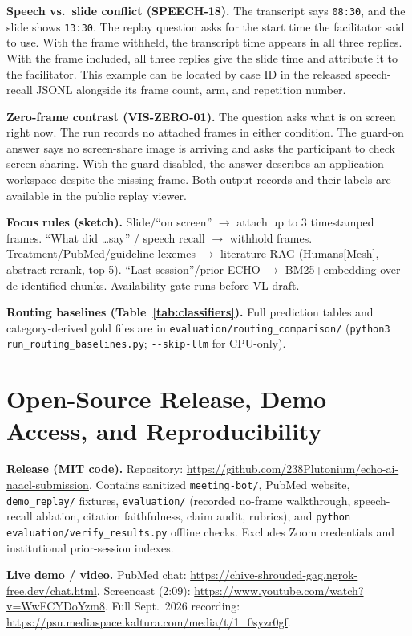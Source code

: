 \documentclass[11pt]{article}
\begin{document}
\textbf{Speech vs.\ slide conflict (SPEECH-18).} The transcript says \texttt{08:30}, and the slide shows \texttt{13:30}. The replay question asks for the start time the facilitator said to use. With the frame withheld, the transcript time appears in all three replies. With the frame included, all three replies give the slide time and attribute it to the facilitator. This example can be located by case ID in the released speech-recall JSONL alongside its frame count, arm, and repetition number.

\textbf{Zero-frame contrast (VIS-ZERO-01).} The question asks what is on screen right now. The run records no attached frames in either condition. The guard-on answer says no screen-share image is arriving and asks the participant to check screen sharing. With the guard disabled, the answer describes an application workspace despite the missing frame. Both output records and their labels are available in the public replay viewer.

\textbf{Focus rules (sketch).} Slide/``on screen'' $\rightarrow$ attach up to 3 timestamped frames. ``What did \ldots say'' / speech recall $\rightarrow$ withhold frames. Treatment/PubMed/guideline lexemes $\rightarrow$ literature RAG (Humans[Mesh], abstract rerank, top 5). ``Last session''/prior ECHO $\rightarrow$ BM25+embedding over de-identified chunks. Availability gate runs before VL draft.

\textbf{Routing baselines (Table~\ref{tab:classifiers}).} Full prediction tables and category-derived gold files are in \nolinkurl{evaluation/routing_comparison/} (\texttt{python3 run\_routing\_baselines.py}; \texttt{-{}-skip-llm} for CPU-only).

\section{Open-Source Release, Demo Access, and Reproducibility}

\textbf{Release (MIT code).} Repository: \url{https://github.com/238Plutonium/echo-ai-naacl-submission}. Contains sanitized \texttt{meeting-bot/}, PubMed website, \texttt{demo\_replay/} fixtures, \texttt{evaluation/} (recorded no-frame walkthrough, speech-recall ablation, citation faithfulness, claim audit, rubrics), and \texttt{python evaluation/verify\_results.py} offline checks. Excludes Zoom credentials and institutional prior-session indexes.

\textbf{Live demo / video.} PubMed chat: \url{https://chive-shrouded-gag.ngrok-free.dev/chat.html}. Screencast (2:09): \url{https://www.youtube.com/watch?v=WwFCYDoYzm8}. Full Sept.\ 2026 recording: \url{https://psu.mediaspace.kaltura.com/media/t/1_0syzr0gf}.
\end{document}
